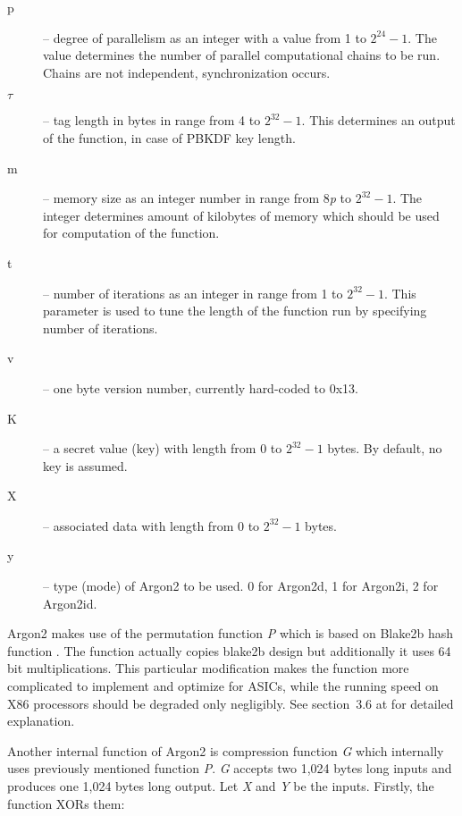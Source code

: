 \documentclass[nolof,digital]{fithesis3}
\begin{document}
\begin{description}
\item[p] -- degree of parallelism as an integer with a value from 1 to \(2^{24} - 1\). The value determines the number of parallel computational chains to be run. Chains are not independent, synchronization occurs.

\item[\(\tau\)] -- tag length in bytes in range from 4 to \(2^{32} - 1\). This determines an output of the function, in case of PBKDF key length.

\item[m] -- memory size as an integer number in range from 8\emph{p} to \(2^{32} - 1\). The integer determines amount of kilobytes of memory which should be used for computation of the function.

\item[t] -- number of iterations as an integer in range from 1 to \(2^{32} - 1\). This parameter is used to tune the length of the function run by specifying number of iterations.

\item[v] -- one byte version number, currently hard-coded to 0x13.

\item[K] -- a secret value (key) with length from 0 to \(2^{32} - 1\) bytes. By default, no key is assumed.

\item[X] -- associated data with length from 0 to \(2^{32} - 1\) bytes.

\item[y] -- type (mode) of Argon2 to be used. 0 for Argon2d, 1 for Argon2i, 2 for Argon2id.
\end{description}

Argon2 makes use of the permutation function \emph{P} which is based on Blake2b hash function \parencite{blake2}. The function actually copies blake2b design but additionally it uses 64 bit multiplications. This particular modification makes the function more complicated to implement and optimize for ASICs, while the running speed on X86 processors should be degraded only negligibly. See section~3.6 at \parencite{argon2draft} for detailed explanation.

Another internal function of Argon2 is compression function \emph{G} which internally uses previously mentioned function \emph{P}. \emph{G} accepts two 1,024 bytes long inputs and produces one 1,024 bytes long output. Let \emph{X} and \emph{Y} be the inputs. Firstly, the function XORs them:
\end{document}
